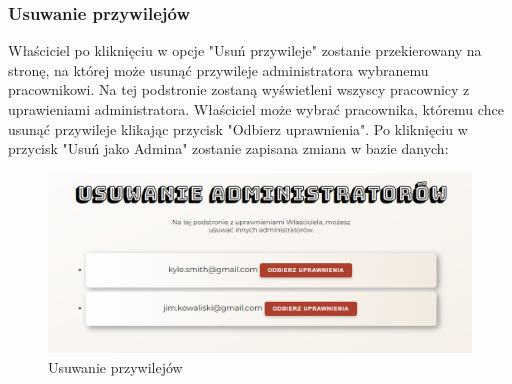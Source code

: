 \subsubsection{Usuwanie przywilejów}
\noindent Właściciel po kliknięciu w opcje "Usuń przywileje" zostanie przekierowany na stronę,
na której może usunąć przywileje administratora wybranemu pracownikowi. Na tej podstronie zostaną
wyświetleni wszyscy pracownicy z uprawieniami administratora. Właściciel może wybrać pracownika, któremu chce usunąć przywileje klikając
przycisk "Odbierz uprawnienia". Po kliknięciu w przycisk "Usuń jako Admina" zostanie zapisana zmiana w bazie danych:
\begin{figure}[h]
    \centering
    \includegraphics[scale=0.45]{photos/usuwanie_przywilejow.png}
    \caption{Usuwanie przywilejów}
    \label{fig:login}
\end{figure}